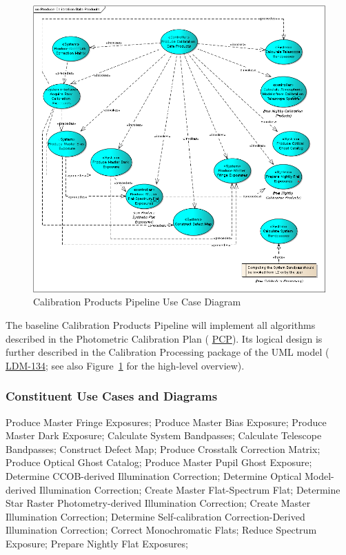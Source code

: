 \documentclass[12pt]{article}
\newcommand{\ds}[2]{{\color{blue} \href{https://docushare.lsstcorp.org/docushare/dsweb/Get/#1}{#2}}\xspace}
\newcommand{\appsUMLusecase}{\ds{LDM-134}{LDM-134}}
\newcommand{\PCP}{\ds{Document-8123}{PCP}}
\begin{document}
\begin{figure}
\includegraphics[angle=0,scale=0.44]{produce_calibration_data_products.png}
\caption{Calibration Products Pipeline Use Case Diagram\label{fig:cppUML}}
\end{figure}

The baseline Calibration Products Pipeline will implement all algorithms described in the Photometric Calibration Plan (\PCP). Its logical design is further described in the Calibration Processing package of the UML model (\appsUMLusecase; see also Figure~\ref{fig:cppUML} for the high-level overview).

\subsubsection{Constituent Use Cases and Diagrams}

Produce Master Fringe Exposures; Produce Master Bias Exposure; Produce Master Dark Exposure; Calculate System Bandpasses; Calculate Telescope Bandpasses; Construct Defect Map; Produce Crosstalk Correction Matrix; Produce Optical Ghost Catalog; Produce Master Pupil Ghost Exposure; Determine CCOB-derived Illumination Correction; Determine Optical Model-derived Illumination Correction; Create Master Flat-Spectrum Flat; Determine Star Raster Photometry-derived Illumination Correction; Create Master Illumination Correction; Determine Self-calibration Correction-Derived Illumination Correction; Correct Monochromatic Flats; Reduce Spectrum Exposure; Prepare Nightly Flat Exposures;
\end{document}
